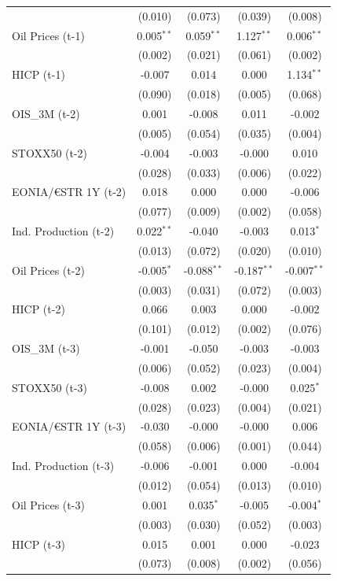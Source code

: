 \begin{longtable}[t]{lcccc}
 & (0.010) & (0.073) & (0.039) & (0.008)\\
Oil Prices (t-1) & 0.005$^{**}$ & 0.059$^{**}$ & 1.127$^{**}$ & 0.006$^{**}$\\
 & (0.002) & (0.021) & (0.061) & (0.002)\\
HICP (t-1) & -0.007 & 0.014 & 0.000 & 1.134$^{**}$\\
 & (0.090) & (0.018) & (0.005) & (0.068)\\
OIS\_3M (t-2) & 0.001 & -0.008 & 0.011 & -0.002\\
 & (0.005) & (0.054) & (0.035) & (0.004)\\
STOXX50 (t-2) & -0.004 & -0.003 & -0.000 & 0.010\\
 & (0.028) & (0.033) & (0.006) & (0.022)\\
EONIA/€STR 1Y (t-2) & 0.018 & 0.000 & 0.000 & -0.006\\
 & (0.077) & (0.009) & (0.002) & (0.058)\\
Ind. Production (t-2) & 0.022$^{**}$ & -0.040 & -0.003 & 0.013$^{*}$\\
 & (0.013) & (0.072) & (0.020) & (0.010)\\
Oil Prices (t-2) & -0.005$^{*}$ & -0.088$^{**}$ & -0.187$^{**}$ & -0.007$^{**}$\\
 & (0.003) & (0.031) & (0.072) & (0.003)\\
HICP (t-2) & 0.066 & 0.003 & 0.000 & -0.002\\
 & (0.101) & (0.012) & (0.002) & (0.076)\\
OIS\_3M (t-3) & -0.001 & -0.050 & -0.003 & -0.003\\
 & (0.006) & (0.052) & (0.023) & (0.004)\\
STOXX50 (t-3) & -0.008 & 0.002 & -0.000 & 0.025$^{*}$\\
 & (0.028) & (0.023) & (0.004) & (0.021)\\
EONIA/€STR 1Y (t-3) & -0.030 & -0.000 & -0.000 & 0.006\\
 & (0.058) & (0.006) & (0.001) & (0.044)\\
Ind. Production (t-3) & -0.006 & -0.001 & 0.000 & -0.004\\
 & (0.012) & (0.054) & (0.013) & (0.010)\\
Oil Prices (t-3) & 0.001 & 0.035$^{*}$ & -0.005 & -0.004$^{*}$\\
 & (0.003) & (0.030) & (0.052) & (0.003)\\
HICP (t-3) & 0.015 & 0.001 & 0.000 & -0.023\\
 & (0.073) & (0.008) & (0.002) & (0.056)\\

\end{longtable}
